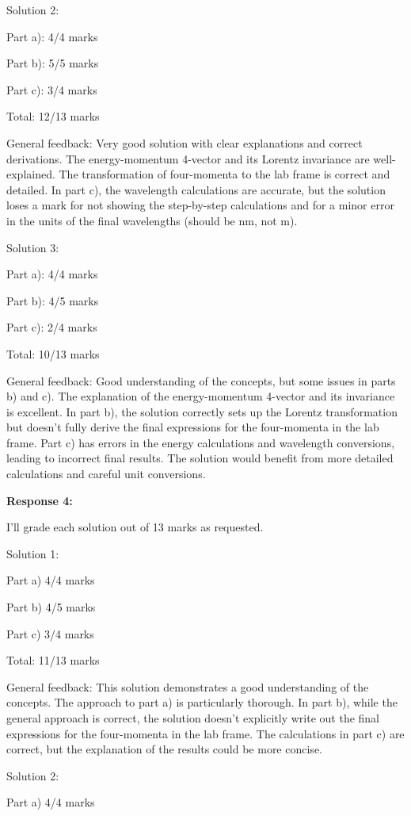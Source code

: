 \documentclass[a4paper,11pt]{article}
\begin{document}
Solution 2:

Part a): 4/4 marks

Part b): 5/5 marks

Part c): 3/4 marks

Total: 12/13 marks

General feedback: Very good solution with clear explanations and correct derivations. The energy-momentum 4-vector and its Lorentz invariance are well-explained. The transformation of four-momenta to the lab frame is correct and detailed. In part c), the wavelength calculations are accurate, but the solution loses a mark for not showing the step-by-step calculations and for a minor error in the units of the final wavelengths (should be nm, not m).

Solution 3:

Part a): 4/4 marks

Part b): 4/5 marks

Part c): 2/4 marks

Total: 10/13 marks

General feedback: Good understanding of the concepts, but some issues in parts b) and c). The explanation of the energy-momentum 4-vector and its invariance is excellent. In part b), the solution correctly sets up the Lorentz transformation but doesn't fully derive the final expressions for the four-momenta in the lab frame. Part c) has errors in the energy calculations and wavelength conversions, leading to incorrect final results. The solution would benefit from more detailed calculations and careful unit conversions.

\bigskip
\textbf{Response 4:}

I'll grade each solution out of 13 marks as requested.

Solution 1:

Part a) 4/4 marks

Part b) 4/5 marks

Part c) 3/4 marks

Total: 11/13 marks

General feedback: This solution demonstrates a good understanding of the concepts. The approach to part a) is particularly thorough. In part b), while the general approach is correct, the solution doesn't explicitly write out the final expressions for the four-momenta in the lab frame. The calculations in part c) are correct, but the explanation of the results could be more concise.

Solution 2:

Part a) 4/4 marks
\end{document}
